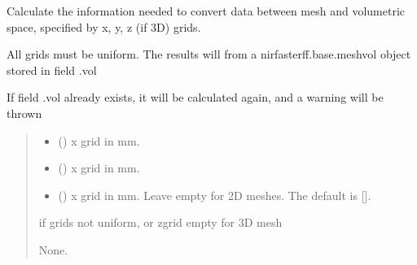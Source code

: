 \documentclass[letterpaper,10pt,english]{sphinxmanual}
\begin{document}
\begin{fulllineitems}
\begin{fulllineitems}
\label{\detokenize{_autosummary/nirfasterff.base.mesh.mesh:nirfasterff.base.mesh.mesh.gen_intmat}}
\pysigstartsignatures
\pysiglinewithargsret
{}
{\sphinxparamcomma {}\sphinxparamcomma {}}
{}
\pysigstopsignatures
\sphinxAtStartPar
Calculate the information needed to convert data between mesh and volumetric space, specified by x, y, z (if 3D) grids.

\sphinxAtStartPar
All grids must be uniform. The results will from a nirfasterff.base.meshvol object stored in field .vol

\sphinxAtStartPar
If field .vol already exists, it will be calculated again, and a warning will be thrown
\begin{quote}\begin{description}
\begin{itemize}
\item {} 
\sphinxAtStartPar
{} () \textendash{} x grid in mm.

\item {} 
\sphinxAtStartPar
{} () \textendash{} x grid in mm.

\item {} 
\sphinxAtStartPar
{} (\sphinxstyleliteralemphasis{\sphinxupquote{, }}) \textendash{} x grid in mm. Leave empty for 2D meshes. The default is {[}{]}.

\end{itemize}

\sphinxAtStartPar
{} \textendash{} if grids not uniform, or zgrid empty for 3D mesh

\sphinxAtStartPar
None.

\end{description}\end{quote}

\end{fulllineitems}


\end{fulllineitems}
\end{document}
